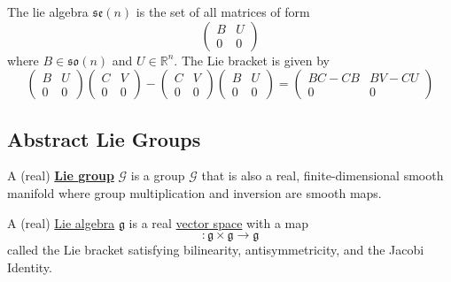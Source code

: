     \begin{example}
      \label{ex:the-lie-algebra-mathfraksen}
      The lie algebra $\mathfrak{se}(n)$ is the set of all matrices of form 
      \begin{equation}
        \begin{pmatrix}
        B & U \\ 0 & 0
        \end{pmatrix}
      \end{equation}
      where $B \in \mathfrak{so}(n)$ and $U \in \mathbb{R}^n$. The Lie bracket is given by
      \begin{equation}
        \begin{pmatrix}
        B & U \\ 0 & 0
        \end{pmatrix} \begin{pmatrix}
        C & V \\ 0 & 0
        \end{pmatrix} - \begin{pmatrix}
        C & V \\ 0 & 0
        \end{pmatrix} \begin{pmatrix}
        B & U \\ 0 & 0
        \end{pmatrix} = \begin{pmatrix}
        BC - CB & BV - CU \\ 0 & 0
        \end{pmatrix}
      \end{equation}
    \end{example}

\subsection{Abstract Lie Groups}

  \begin{definition}
    \label{def:lie-group-abstract-formulation}
    A (real) \textbf{\hyperref[def:lie-group]{Lie group}} $\mathcal{G}$ is a group $\mathcal{G}$ that is also a real, finite-dimensional smooth manifold where  group multiplication and inversion are smooth maps. 
  \end{definition}

  \begin{definition}
    \label{def:lie-algebra-abstract-formulation}
    A (real) \hyperref[def:lie-algebra]{Lie algebra} $\mathfrak{g}$ is a real \hyperref[def:vector-space]{vector space} with a map 
    \begin{equation}
      [\cdot, \cdot]: \mathfrak{g} \times \mathfrak{g} \rightarrow \mathfrak{g}
    \end{equation}
    called the Lie bracket satisfying bilinearity, antisymmetricity, and the Jacobi Identity. 
  \end{definition}

